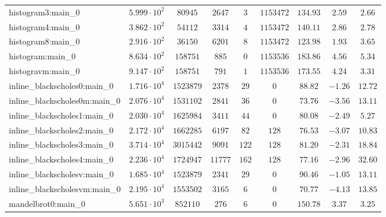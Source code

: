 \begin{tabular}{|l|c|c|c|c|c|c|c|c|}
histogram3:main\_0             & $ 5.999 \cdot 10^{2} $ & $ 80945    $ & $ 2647   $ & $ 3    $ & $ 1153472  $ & $ 134.93      $ & $ 2.59    $ & $ 2.66    $ \\
histogram4:main\_0             & $ 3.862 \cdot 10^{2} $ & $ 54112    $ & $ 3314   $ & $ 4    $ & $ 1153472  $ & $ 140.11      $ & $ 2.86    $ & $ 2.78    $ \\
histogram8:main\_0             & $ 2.916 \cdot 10^{2} $ & $ 36150    $ & $ 6201   $ & $ 8    $ & $ 1153472  $ & $ 123.98      $ & $ 1.93    $ & $ 3.65    $ \\
histogram:main\_0              & $ 8.634 \cdot 10^{2} $ & $ 158751   $ & $ 885    $ & $ 0    $ & $ 1153536  $ & $ 183.86      $ & $ 4.56    $ & $ 5.34    $ \\
histogravm:main\_0             & $ 9.147 \cdot 10^{2} $ & $ 158751   $ & $ 791    $ & $ 1    $ & $ 1153536  $ & $ 173.55      $ & $ 4.24    $ & $ 3.31    $ \\
inline\_blackscholes0:main\_0  & $ 1.716 \cdot 10^{4} $ & $ 1523879  $ & $ 2378   $ & $ 29   $ & $ 0        $ & $ 88.82       $ & $ -1.26   $ & $ 12.72   $ \\
inline\_blackscholes0m:main\_0 & $ 2.076 \cdot 10^{4} $ & $ 1531102  $ & $ 2841   $ & $ 36   $ & $ 0        $ & $ 73.76       $ & $ -3.56   $ & $ 13.11   $ \\
inline\_blackscholes1:main\_0  & $ 2.030 \cdot 10^{4} $ & $ 1625984  $ & $ 3411   $ & $ 44   $ & $ 0        $ & $ 80.08       $ & $ -2.49   $ & $ 5.27    $ \\
inline\_blackscholes2:main\_0  & $ 2.172 \cdot 10^{4} $ & $ 1662285  $ & $ 6197   $ & $ 82   $ & $ 128      $ & $ 76.53       $ & $ -3.07   $ & $ 10.83   $ \\
inline\_blackscholes3:main\_0  & $ 3.714 \cdot 10^{4} $ & $ 3015442  $ & $ 9091   $ & $ 122  $ & $ 128      $ & $ 81.20       $ & $ -2.31   $ & $ 18.84   $ \\
inline\_blackscholes4:main\_0  & $ 2.236 \cdot 10^{4} $ & $ 1724947  $ & $ 11777  $ & $ 162  $ & $ 128      $ & $ 77.16       $ & $ -2.96   $ & $ 32.60   $ \\
inline\_blackscholesv:main\_0  & $ 1.685 \cdot 10^{4} $ & $ 1523879  $ & $ 2341   $ & $ 29   $ & $ 0        $ & $ 90.46       $ & $ -1.05   $ & $ 13.11   $ \\
inline\_blackscholesvm:main\_0 & $ 2.195 \cdot 10^{4} $ & $ 1553502  $ & $ 3165   $ & $ 6    $ & $ 0        $ & $ 70.77       $ & $ -4.13   $ & $ 13.85   $ \\
mandelbrot0:main\_0            & $ 5.651 \cdot 10^{3} $ & $ 852110   $ & $ 276    $ & $ 6    $ & $ 0        $ & $ 150.78      $ & $ 3.37    $ & $ 3.25    $ \\

\end{tabular}
